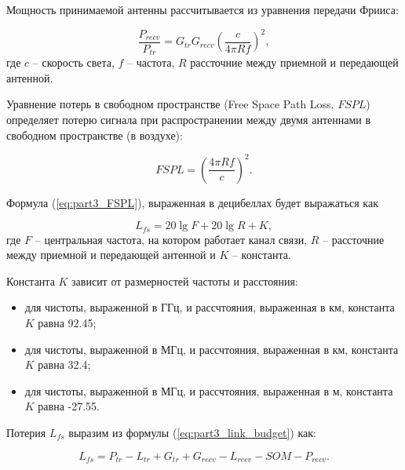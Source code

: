 Мощность принимаемой антенны рассчитывается из уравнения передачи Фрииса:

\begin{displaymath}
  \label{eq:part3_Friis}
  \frac{P_{recv}}{P_{tr}} = G_{tr}G_{recv}\left(\frac{c}{4\pi R f} \right)^2,
\end{displaymath}
где
$c$ --  скорость света,
$f$ -- частота, 
$R$ рассточние между приемной и передающей антенной.


Уравнение потерь в свободном пространстве (Free Space Path Loss, $FSPL $) определяет потерю сигнала при распространении между двумя антеннами в свободном пространстве (в воздухе):

\begin{equation}
  \label{eq:part3_FSPL}
  FSPL = \left(\frac{4\pi R f}{c} \right)^2.
\end{equation}

Формула (\cref{eq:part3_FSPL}), выраженная в децибеллах будет выражаться как

\begin{equation}
  \label{eq:part3_L_fs}
  L_{fs} = 20 \lg{F} + 20\lg{R} + K,
  \end{equation}
где $F$ -- центральная частота, на котором работает канал связи, $R$ -- рассточние между приемной и передающей антенной и $K$ -- константа.

Константа $K$ зависит от размерностей частоты и расстояния:

\begin{itemize}
  \item для чистоты, выраженной в ГГц, и рассчтояния, выраженная в км, константа $K$ равна 92.45;
  \item для чистоты, выраженной в МГц, и рассчтояния, выраженная в км, константа $K$ равна 32.4;
  \item для чистоты, выраженной в МГц, и рассчтояния, выраженная в м, константа $K$ равна -27.55.
\end{itemize} 

Потерия $L_{fs}$ выразим из формулы (\cref{eq:part3_link_budget}) как:

\begin{equation}
  \label{eq:part3_L_fs_from_link_budget}
  L_{fs} = P_{tr} - L_{tr} + G_{tr} + G_{recv} - L_{recv} - SOM - P_{recv}.
\end{equation}

